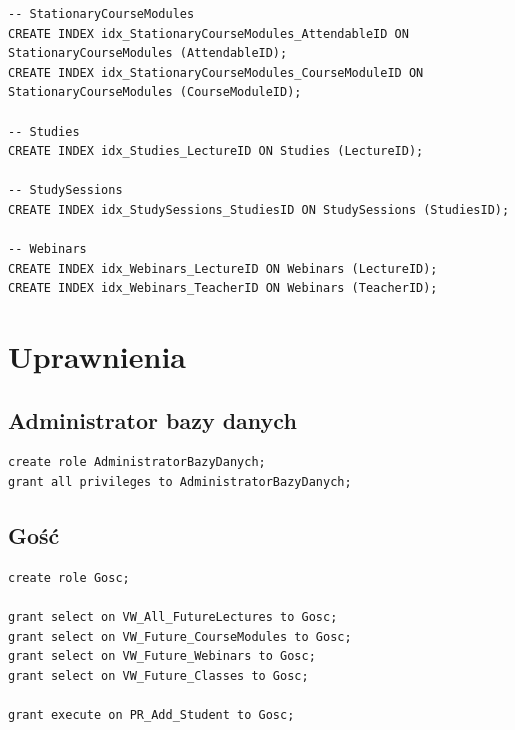 \documentclass[11pt,a4paper]{article}
\begin{document}
\begin{Verbatim}[breaklines=true]
-- StationaryCourseModules
CREATE INDEX idx_StationaryCourseModules_AttendableID ON StationaryCourseModules (AttendableID);
CREATE INDEX idx_StationaryCourseModules_CourseModuleID ON StationaryCourseModules (CourseModuleID);

-- Studies
CREATE INDEX idx_Studies_LectureID ON Studies (LectureID);

-- StudySessions
CREATE INDEX idx_StudySessions_StudiesID ON StudySessions (StudiesID);

-- Webinars
CREATE INDEX idx_Webinars_LectureID ON Webinars (LectureID);
CREATE INDEX idx_Webinars_TeacherID ON Webinars (TeacherID);
\end{Verbatim}

\section{Uprawnienia}
\subsection{Administrator bazy danych}
\begin{Verbatim}
create role AdministratorBazyDanych;
grant all privileges to AdministratorBazyDanych;
\end{Verbatim}
\subsection{Gość}
\begin{Verbatim}
create role Gosc;

grant select on VW_All_FutureLectures to Gosc;
grant select on VW_Future_CourseModules to Gosc;
grant select on VW_Future_Webinars to Gosc;
grant select on VW_Future_Classes to Gosc;

grant execute on PR_Add_Student to Gosc;
\end{Verbatim}
\end{document}
